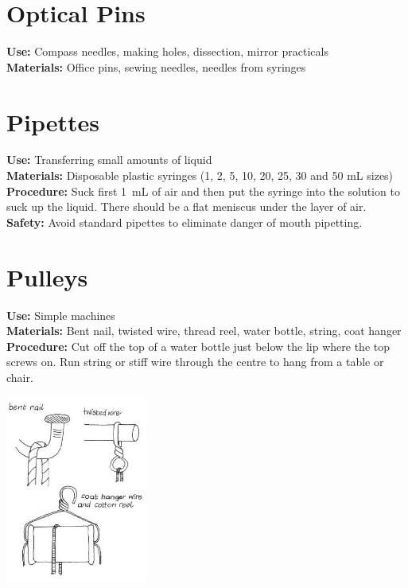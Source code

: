 \begin{multicols}{2}
\section{Optical Pins}
\label{sec:optical-pins}
\vspace{-10pt}
\textbf{Use:} Compass needles, making holes, dissection, mirror practicals\\
\textbf{Materials:} Office pins, sewing needles, needles from syringes

\section{Pipettes}
\label{sec:pipettes}
\vspace{-10pt}
\textbf{Use:} Transferring small amounts of liquid\\
\textbf{Materials:} Disposable plastic syringes (1, 2, 5, 10, 20, 25, 30 and 50 mL sizes)\\
\textbf{Procedure:} Suck first 1~mL of air and then put the syringe into the solution to suck up the liquid. There should be a flat meniscus under the layer of air.\\
\textbf{Safety:} Avoid standard pipettes to eliminate danger of mouth pipetting.

\columnbreak

\section{Pulleys}
\label{sec:pulleys}
\vspace{-10pt}
\textbf{Use:} Simple machines\\
\textbf{Materials:} Bent nail, twisted wire, thread reel, water bottle, string, coat hanger\\
\textbf{Procedure:} Cut off the top of a water bottle just below the lip where the top screws on. Run string or stiff wire through the centre to hang from a table or chair.
\begin{center}
\includegraphics[width=0.35\textwidth]{./img/vso/pulleys.jpg}
\end{center}


\end{multicols}
